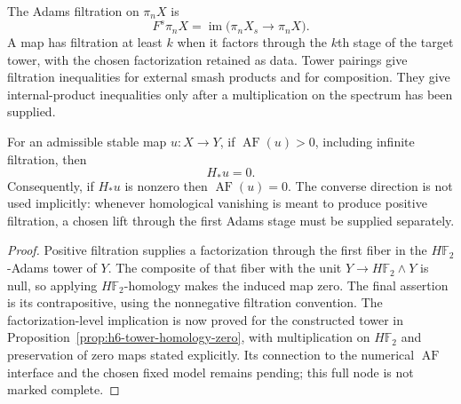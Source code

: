 \begin{definition}
  \label{def:adams-tower-filtration}
  \notready
  The Adams filtration on $\pi_nX$ is
  \[
    F^s\pi_nX=\operatorname{im}\bigl(\pi_nX_s\longrightarrow\pi_nX\bigr).
  \]
  A map has filtration at least $k$ when it factors through the $k$th stage of
  the target tower, with the chosen factorization retained as data.  Tower
  pairings give filtration inequalities for external smash products and for
  composition.  They give internal-product inequalities only after a
  multiplication on the spectrum has been supplied.
\end{definition}

\begin{proposition}
  \label{prop:positive-adams-filtration-homology-zero}
  \notready
  For an admissible stable map $u:X\to Y$, if
  $\operatorname{AF}(u)>0$, including infinite filtration, then
  \[
    H_*u=0.
  \]
  Consequently, if $H_*u$ is nonzero then $\operatorname{AF}(u)=0$.  The
  converse direction is not used implicitly: whenever homological vanishing
  is meant to produce positive filtration, a chosen lift through the first
  Adams stage must be supplied separately.
\end{proposition}

\begin{proof}
  Positive filtration supplies a factorization through the first fiber in the
  $H\mathbb F_2$-Adams tower of $Y$.  The composite of that fiber with the
  unit $Y\to H\mathbb F_2\wedge Y$ is null, so applying
  $H\mathbb F_2$-homology makes the induced map zero.  The final assertion is
  its contrapositive, using the nonnegative filtration convention.
  The factorization-level implication is now proved for the constructed
  tower in Proposition~\ref{prop:h6-tower-homology-zero}, with multiplication
  on $H\mathbb F_2$ and preservation of zero maps stated explicitly.
  Its connection to the numerical $\operatorname{AF}$ interface and the
  chosen fixed model remains pending; this full node is not marked complete.
\end{proof}

